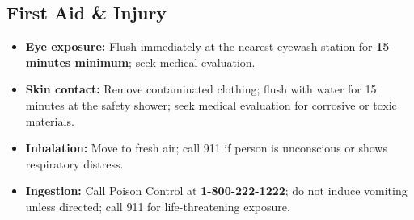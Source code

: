 \subsection{First Aid \& Injury}
\begin{itemize}[noitemsep, topsep=2pt, leftmargin=1.4em]
  \item \textbf{Eye exposure:} Flush immediately at the nearest eyewash station for \textbf{15 minutes minimum}; seek medical evaluation.
  \item \textbf{Skin contact:} Remove contaminated clothing; flush with water for 15 minutes at the safety shower; seek medical evaluation for corrosive or toxic materials.
  \item \textbf{Inhalation:} Move to fresh air; call 911 if person is unconscious or shows respiratory distress.
  \item \textbf{Ingestion:} Call Poison Control at \textbf{1-800-222-1222}; do not induce vomiting unless directed; call 911 for life-threatening exposure.
\end{itemize}

